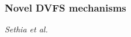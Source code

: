 

\subsubsection{Novel DVFS mechanisms}

\textit{Sethia et al.} \cite{sethia_equalizer:_2014}






